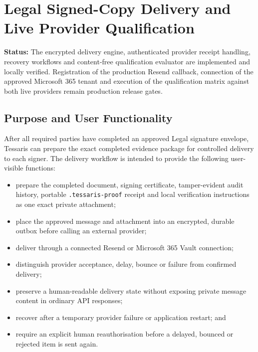 
\section{Legal Signed-Copy Delivery and Live Provider Qualification}
\label{sec:legal-live-signing-delivery}

\noindent\textbf{Status:} The encrypted delivery engine, authenticated provider
receipt handling, recovery workflows and content-free qualification evaluator
are implemented and locally verified.  Registration of the production Resend
callback, connection of the approved Microsoft 365 tenant and execution of the
qualification matrix against both live providers remain production release
gates.

\subsection{Purpose and User Functionality}

After all required parties have completed an approved Legal signature envelope,
Tessaris can prepare the exact completed evidence package for controlled delivery
to each signer.  The delivery workflow is intended to provide the following
user-visible functions:

\begin{itemize}[leftmargin=*]
  \item prepare the completed document, signing certificate, tamper-evident audit
        history, portable \texttt{.tessaris-proof} receipt and local verification
        instructions as one exact private attachment;
  \item place the approved message and attachment into an encrypted, durable
        outbox before calling an external provider;
  \item deliver through a connected Resend or Microsoft 365 Vault connection;
  \item distinguish provider acceptance, delay, bounce or failure from confirmed
        delivery;
  \item preserve a human-readable delivery state without exposing private message
        content in ordinary API responses;
  \item recover after a temporary provider failure or application restart; and
  \item require an explicit human reauthorisation before a delayed, bounced or
        rejected item is sent again.
\end{itemize}

